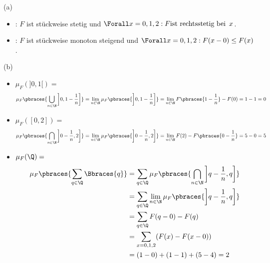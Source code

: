 \begin{solution}

(a)

\begin{itemize}

  \item {}: $F$ ist stückweise stetig und $\Forall x = 0, 1, 2: F \text{ist rechtsstetig bei} \enspace x$.

  \item {}: $F$ ist stückweise monoton steigend und $\Forall x = 0, 1, 2: F(x - 0) \leq F(x)$.

\end{itemize}

(b)

\begin{itemize}

  \item $\mu_F(]0, 1[) =$
  \begin{align*}
    \mu_F \pbraces{\bigcup_{n \in \N} \left ] 0, 1 - \frac{1}{n} \right ]}
    =
    \lim_{n \in \N} \mu_F \pbraces{\left ] 0, 1 - \frac{1}{n} \right ]}
    =
    \lim_{n \in \N} F \pbraces{1 - \frac{1}{n}} - F(0)
    = 1 - 1 = 0
  \end{align*}

  \item $\mu_F([0, 2]) =$
  \begin{align*}
    \mu_F \pbraces{\bigcap_{n \in \N} \left ] 0 - \frac{1}{n}, 2 \right ]}
    =
    \lim_{n \in \N} \mu_F \pbraces{\left ] 0 - \frac{1}{n}, 2 \right ]}
    =
    \lim_{n \in \N} F(2) - F \pbraces{0 - \frac{1}{n}}
    =
    5 - 0 = 5
  \end{align*}

  \item $\mu_F(\Q) =$
  \begin{align*}
    \mu_F \pbraces{\sum_{q \in \Q} \Bbraces{q}}
    & =
    \sum_{q \in \Q} \mu_F \pbraces
    {\bigcap_{n \in \N} \left ] q - \frac{1}{n}, q \right ]} \\
    & =
    \sum_{q \in \Q} \lim_{n \in \N} \mu_F \pbraces
    {\left ] q - \frac{1}{n}, q \right ]} \\
    & =
    \sum_{q \in \Q} F(q - 0) - F(q) \\
    & =
    \sum_{x = 0, 1, 2} (F(x) - F(x - 0)) \\
    & =
    (1 - 0) + (1 - 1) + (5 - 4) = 2
  \end{align*}

\end{itemize}


\end{solution}
